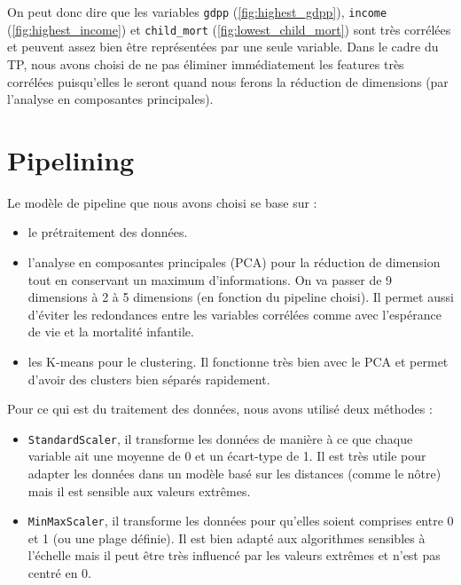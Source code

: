 \documentclass{article}
\begin{document}
\noindent On peut donc dire que les variables \texttt{gdpp} (\ref{fig:highest_gdpp}), \texttt{income} (\ref{fig:highest_income}) et \texttt{child\_mort} (\ref{fig:lowest_child_mort}) sont très corrélées et peuvent assez bien être représentées par une seule variable. Dans le cadre du TP, nous avons choisi de ne pas éliminer immédiatement les features très corrélées puisqu’elles le seront quand nous ferons la réduction de dimensions (par l’analyse en composantes principales).

\newpage
\section{Pipelining}

\noindent Le modèle de pipeline que nous avons choisi se base sur :

\begin{itemize}
    \item le prétraitement des données.
    \item l’analyse en composantes principales (PCA) pour la réduction de dimension tout en conservant un maximum d'informations. On va passer de 9 dimensions à 2 à 5 dimensions (en fonction du pipeline choisi). Il permet aussi d'éviter les redondances entre les variables corrélées comme avec l'espérance de vie et la mortalité infantile.
    \item les K-means pour le clustering. Il fonctionne très bien avec le PCA et permet d'avoir des clusters bien séparés rapidement.
\end{itemize}

Pour ce qui est du traitement des données, nous avons utilisé deux méthodes :

\begin{itemize}
    \item \texttt{StandardScaler}, il transforme les données de manière à ce que chaque variable ait une moyenne de 0 et un écart-type de 1. Il est très utile pour adapter les données dans un modèle basé sur les distances (comme le nôtre) mais il est sensible aux valeurs extrêmes.
    \item \texttt{MinMaxScaler}, il transforme les données pour qu'elles soient comprises entre 0 et 1 (ou une plage définie). Il est bien adapté aux algorithmes sensibles à l'échelle mais il peut être très influencé par les valeurs extrêmes et n'est pas centré en 0.
\end{itemize}
\end{document}
